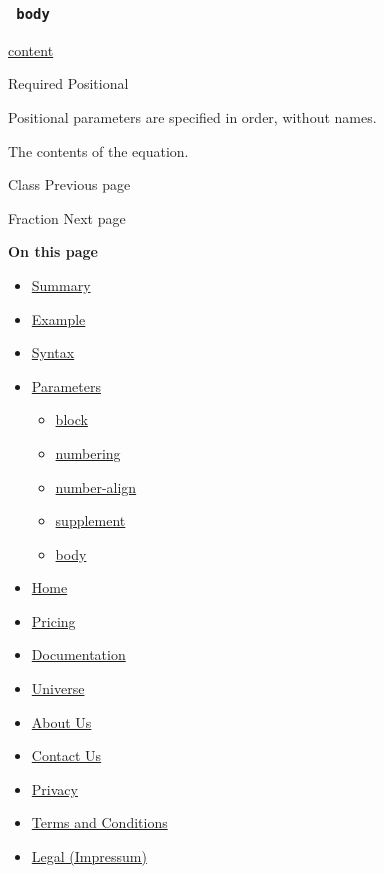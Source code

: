 \subsubsection{\texorpdfstring{\texttt{\ body\ }}{ body }}\label{parameters-body}

\href{/docs/reference/foundations/content/}{content}

{Required} {{ Positional }}

\label{parameters-body-positional-tooltip}
Positional parameters are specified in order, without names.

The contents of the equation.

\href{/docs/reference/math/class/}{\pandocbounded{}}

{ Class } { Previous page }

\href{/docs/reference/math/frac/}{\pandocbounded{}}

{ Fraction } { Next page }

\textbf{On this page}

\begin{itemize}
\tightlist
\item
  \hyperref[summary]{Summary}
\item
  \hyperref[example]{Example}
\item
  \hyperref[syntax]{Syntax}
\item
  \hyperref[parameters]{Parameters}

  \begin{itemize}
  \tightlist
  \item
    \hyperref[parameters-block]{block}
  \item
    \hyperref[parameters-numbering]{numbering}
  \item
    \hyperref[parameters-number-align]{number-align}
  \item
    \hyperref[parameters-supplement]{supplement}
  \item
    \hyperref[parameters-body]{body}
  \end{itemize}
\end{itemize}

\begin{itemize}
\tightlist
\item
  \href{/}{Home}
\item
  \href{/pricing/}{Pricing}
\item
  \href{/docs/}{Documentation}
\item
  \href{/universe/}{Universe}
\item
  \href{/about/}{About Us}
\item
  \href{/contact/}{Contact Us}
\item
  \href{/privacy/}{Privacy}
\item
  \href{https://typst.app/terms}{Terms and Conditions}
\item
  \href{/legal/}{Legal (Impressum)}
\end{itemize}

